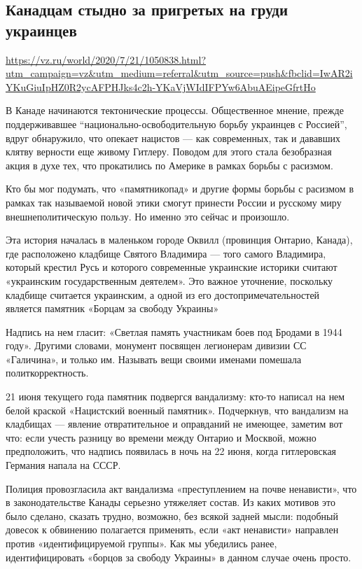  
 

\subsection{Канадцам стыдно за пригретых на груди украинцев}
\label{sec:21_07_2020.news.ru.vz_ru.1}
\url{https://vz.ru/world/2020/7/21/1050838.html?utm_campaign=vz&utm_medium=referral&utm_source=push&fbclid=IwAR2iYKuGiuIpHZ0R2ycAFPHJks4c2h-YKaVjWIdIFPYw6AbuAEipeGfrtHo}
  

В Канаде начинаются тектонические процессы. Общественное мнение, прежде
поддерживавшее ``национально-освободительную борьбу украинцев с Россией'', вдруг
обнаружило, что опекает нацистов --- как современных, так и дававших клятву
верности еще живому Гитлеру. Поводом для этого стала безобразная акция в духе
тех, что прокатились по Америке в рамках борьбы с расизмом.

Кто бы мог подумать, что «памятникопад» и другие формы борьбы с расизмом в
рамках так называемой новой этики смогут принести России и русскому миру
внешнеполитическую пользу. Но именно это сейчас и произошло.

Эта история началась в маленьком городе Оквилл (провинция Онтарио, Канада), где
расположено кладбище Святого Владимира --- того самого Владимира, который крестил
Русь и которого современные украинские историки считают «украинским
государственным деятелем». Это важное уточнение, поскольку кладбище считается
украинским, а одной из его достопримечательностей является памятник «Борцам за
свободу Украины»

Надпись на нем гласит: «Светлая память участникам боев под Бродами в 1944
году». Другими словами, монумент посвящен легионерам дивизии СС «Галичина», и
только им. Называть вещи своими именами помешала политкорректность.

21 июня текущего года памятник подвергся вандализму: кто-то написал на нем
белой краской «Нацистский военный памятник». Подчеркнув, что вандализм на
кладбищах --- явление отвратительное и оправданий не имеющее, заметим вот что:
если учесть разницу во времени между Онтарио и Москвой, можно предположить, что
надпись появилась в ночь на 22 июня, когда гитлеровская Германия напала на
СССР.

Полиция провозгласила акт вандализма «преступлением на почве ненависти», что в
законодательстве Канады серьезно утяжеляет состав. Из каких мотивов это было
сделано, сказать трудно, возможно, без всякой задней мысли: подобный довесок к
обвинению полагается применять, если «акт ненависти» направлен против
«идентифицируемой группы». Как мы убедились ранее, идентифицировать «борцов за
свободу Украины» в данном случае очень просто.


